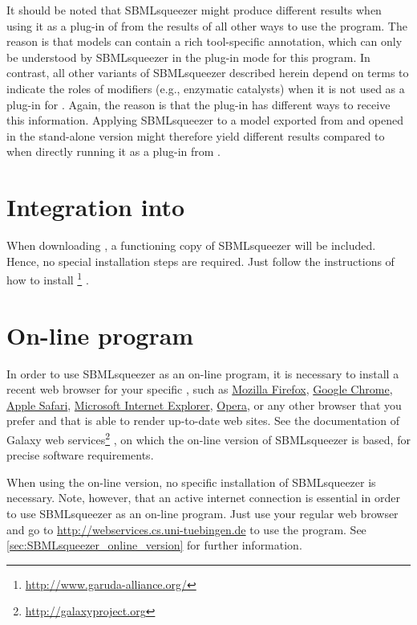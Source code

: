 It should be noted that SBMLsqueezer might produce different results when using it as a plug-in of \CellDesigner from the results of all other ways to use the program.
The reason is that \CellDesigner models can contain a rich tool-specific annotation, which can only be understood by SBMLsqueezer in the plug-in mode for this program.
In contrast, all other variants of SBMLsqueezer described herein depend on \SBO terms to indicate the roles of modifiers (e.g., enzymatic catalysts) when it is not used as a plug-in for \CellDesigner.
Again, the reason is that the \CellDesigner plug-in has different ways to receive this information.
Applying SBMLsqueezer to a model exported from \CellDesigner and opened in the stand-alone version might therefore yield different results compared to when directly running it as a plug-in from \CellDesigner.


\section{Integration into \Garuda}
\label{sec:GarudaInstall}

When downloading \Garuda, a functioning copy of SBMLsqueezer will be included.
Hence, no special installation steps are required. Just follow the instructions
of how to install \Garuda\footnote{\url{http://www.garuda-alliance.org/}} \citep{Ghosh2011}.

\section{On-line program}
\label{sec:WebserviceInstallation}

In order to use SBMLsqueezer as an on-line program, it is necessary to install a recent web browser for your specific \OS, such as \href{http://www.mozilla.org}{Mozilla Firefox}, \href{https://www.google.com/intl/en/chrome/browser/}{Google Chrome}, \href{https://www.apple.com/safari/}{Apple Safari}, \href{http://windows.microsoft.com/en-us/internet-explorer/download-ie}{Microsoft Internet Explorer}, \href{http://www.opera.com/}{Opera}, or any other browser that you prefer and that is able to render up-to-date web sites.
See the documentation of Galaxy web services\footnote{\url{http://galaxyproject.org}} \citep{Goecks2010}, on which the on-line version of SBMLsqueezer is based, for precise software requirements.

When using the on-line version, no specific installation of SBMLsqueezer is necessary.
Note, however, that an active internet connection is essential in order to use SBMLsqueezer as an on-line program.
Just use your regular web browser and go to \url{http://webservices.cs.uni-tuebingen.de} to use the program.
See \vref{sec:SBMLsqueezer_online_version} for further information.


